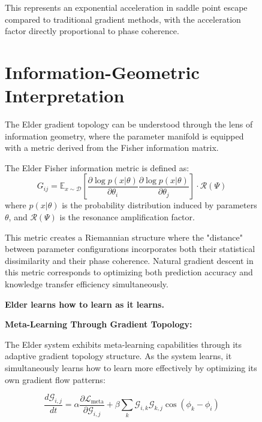 \begin{figure}[ht]
This represents an exponential acceleration in saddle point escape compared to traditional gradient methods, with the acceleration factor directly proportional to phase coherence.

\section{Information-Geometric Interpretation}

The Elder gradient topology can be understood through the lens of information geometry, where the parameter manifold is equipped with a metric derived from the Fisher information matrix.

\begin{definition}
The Elder Fisher information metric is defined as:
\begin{equation}
G_{ij} = \mathbb{E}_{x \sim \mathcal{D}} \left[ \frac{\partial \log p(x|\theta)}{\partial \theta_i} \frac{\partial \log p(x|\theta)}{\partial \theta_j} \right] \cdot \mathcal{R}(\Psi)
\end{equation}
where $p(x|\theta)$ is the probability distribution induced by parameters $\theta$, and $\mathcal{R}(\Psi)$ is the resonance amplification factor.
\end{definition}

This metric creates a Riemannian structure where the "distance" between parameter configurations incorporates both their statistical dissimilarity and their phase coherence. Natural gradient descent in this metric corresponds to optimizing both prediction accuracy and knowledge transfer efficiency simultaneously.

\begin{tcolorbox}[colback=blue!5!white,colframe=blue!50!black,title=Key Insight]
\textbf{Elder learns how to learn as it learns.}
\end{tcolorbox}

\textbf{Meta-Learning Through Gradient Topology:}

The Elder system exhibits meta-learning capabilities through its adaptive gradient topology structure. As the system learns, it simultaneously learns how to learn more effectively by optimizing its own gradient flow patterns:

\begin{equation}
\frac{d\mathcal{G}_{i,j}}{dt} = \alpha \frac{\partial \mathcal{L}_{\text{meta}}}{\partial \mathcal{G}_{i,j}} + \beta \sum_{k} \mathcal{G}_{i,k} \mathcal{G}_{k,j} \cos(\phi_k - \phi_i)
\end{equation}


\end{figure}
